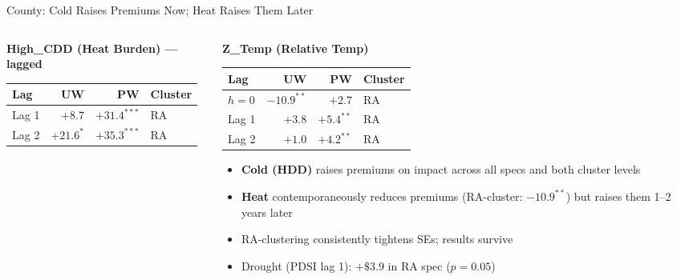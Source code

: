 \documentclass[aspectratio=169,11pt]{beamer}
\newcommand{\emphcolor}[1]{{\color{WarmOrange}\textbf{#1}}}
\newcommand{\tealtext}[1]{{\color{Teal}#1}}
\begin{document}
\begin{frame}{County: Cold Raises Premiums Now; Heat Raises Them Later}
\begin{columns}[T]
\begin{column}{0.47\textwidth}
      \tealtext{\textbf{High\_CDD (Heat Burden) — lagged}}\\[0.25em]
      \begin{tabular}{lrrl}
        \toprule
        Lag & UW & PW & Cluster \\
        \midrule
        Lag 1 & $+8.7$  & \emphcolor{$+31.4^{***}$} & RA \\
        Lag 2 & \emphcolor{$+21.6^{*}$} & \emphcolor{$+35.3^{***}$} & RA \\
        \bottomrule
      \end{tabular}
    \end{column}
    \begin{column}{0.47\textwidth}
      \tealtext{\textbf{Z\_Temp (Relative Temp)}}\\[0.25em]
      \begin{tabular}{lrrl}
        \toprule
        Lag & UW & PW & Cluster \\
        \midrule
        $h{=}0$ & \emphcolor{$-10.9^{**}$} & $+2.7$  & RA \\
        Lag 1   & $+3.8$  & \emphcolor{$+5.4^{**}$}  & RA \\
        Lag 2   & $+1.0$  & \emphcolor{$+4.2^{**}$}  & RA \\
        \bottomrule
      \end{tabular}
      \vspace{0.4em}
      \begin{itemize}\itemsep0.28em
        \item \emphcolor{Cold (HDD)} raises premiums on impact across all specs and both cluster levels
        \item \emphcolor{Heat} contemporaneously reduces premiums (RA-cluster: $-10.9^{**}$) but raises them 1--2 years later
        \item RA-clustering consistently tightens SEs; results survive
        \item Drought (PDSI lag 1): $+\$3.9$ in RA spec ($p{=}0.05$)
      \end{itemize}
    \end{column}
  \end{columns}
\end{frame}
\end{document}
